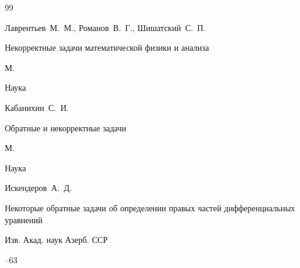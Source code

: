 \begin{thebibliography}{99}








\by Лаврентьев~М.~М., Романов~В.~Г., Шишатский~С.~П.

\book Некорректные задачи математической физики и анализа

\publaddr М.

\publ Наука 






\by Кабанихин~С.~И.

\book Обратные и некорректные задачи

\publaddr М.

\publ Наука 


















\by Искендеров~А.~Д. 

\paper Некоторые обратные задачи об определении правых частей дифференциальных уравнений 

\jour Изв. Акад. наук Азерб. ССР



--63










\end{thebibliography}
